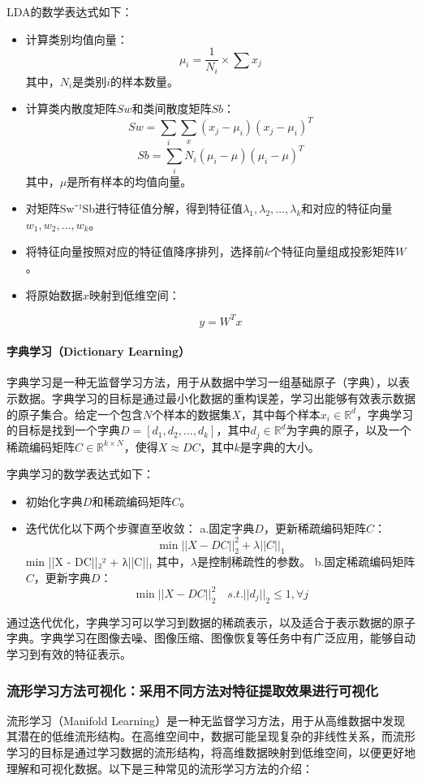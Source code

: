 \documentclass[12pt,hyperref,a4paper,UTF8]{ctexart}
\begin{document}
LDA的数学表达式如下：
\begin{itemize}
\item 计算类别均值向量：
$$
\mu_i = \frac{1}{N_i}\times\sum x_j
$$
其中，$N_i$是类别$i$的样本数量。
\item 计算类内散度矩阵$Sw$和类间散度矩阵$Sb$：
$$
Sw = \sum_i \sum_x (x_j - \mu_i)(x_j - \mu_i)^T
$$
$$
Sb = \sum_i N_i (\mu_i - \mu)(\mu_i - \mu)^T
$$
其中，$\mu$是所有样本的均值向量。
\item 对矩阵Sw⁻¹Sb进行特征值分解，得到特征值$\lambda_1, \lambda_2, \ldots, \lambda_k$和对应的特征向量$w_1, w_2, \ldots, w_k$。
\item 将特征向量按照对应的特征值降序排列，选择前$k$个特征向量组成投影矩阵$W$。
\item 将原始数据$x$映射到低维空间：

$$
y=W^T x
$$

\end{itemize}


\paragraph{字典学习（Dictionary Learning）}
字典学习是一种无监督学习方法，用于从数据中学习一组基础原子（字典），以表示数据。字典学习的目标是通过最小化数据的重构误差，学习出能够有效表示数据的原子集合。给定一个包含$N$个样本的数据集$X$，其中每个样本$x_i \in \mathbb{R}^d$，字典学习的目标是找到一个字典$D = [d_1, d_2, ..., d_k]$，其中$d_j \in \mathbb{R}^d$为字典的原子，以及一个稀疏编码矩阵$C \in \mathbb{R}^{k\times N}$，使得$X \approx DC$，其中$k$是字典的大小。

字典学习的数学表达式如下：
\begin{itemize}
\item 初始化字典$D$和稀疏编码矩阵$C$。
\item 迭代优化以下两个步骤直至收敛：
\subitem a.固定字典$D$，更新稀疏编码矩阵$C$：
$$
\min ||X-DC||_2^2+\lambda ||C||_1
$$
min ||X - DC||₂² + λ||C||₁
其中，$\lambda$是控制稀疏性的参数。
\subitem b.固定稀疏编码矩阵$C$，更新字典$D$：
$$
\min ||X-DC||_2^2 \quad s.t. ||d_j||_2 \le 1, \forall j
$$

\end{itemize}



通过迭代优化，字典学习可以学习到数据的稀疏表示，以及适合于表示数据的原子字典。字典学习在图像去噪、图像压缩、图像恢复等任务中有广泛应用，能够自动学习到有效的特征表示。

\subsubsection{流形学习方法可视化：采用不同方法对特征提取效果进行可视化}
流形学习（Manifold Learning）是一种无监督学习方法，用于从高维数据中发现其潜在的低维流形结构。在高维空间中，数据可能呈现复杂的非线性关系，而流形学习的目标是通过学习数据的流形结构，将高维数据映射到低维空间，以便更好地理解和可视化数据。以下是三种常见的流形学习方法的介绍：
\end{document}
